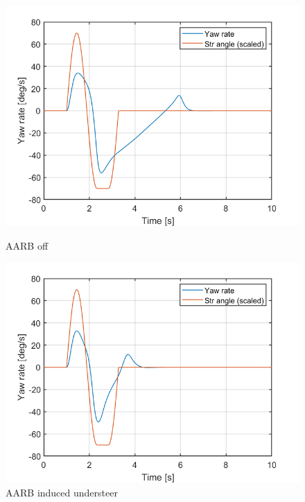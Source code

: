 \begin{figure}[H]
\begin{minipage}[b]{0.49\linewidth}
    \centering
    \includegraphics[width=\textwidth]{Figures/4_4_yaw_normalSteer_140deg.png}
    \caption{AARB off}
    \label{fig:my_label}
\end{minipage}
\begin{minipage}[b]{0.49\linewidth}
    \centering
    \includegraphics[width=\textwidth]{Figures/4_4_yaw_underSteer_140deg.png}
    \caption{AARB induced understeer}
    \label{fig:my_label}
\end{minipage}
\begin{minipage}[b]{0.9\linewidth}
    \centering

\end{minipage}
\end{figure}
